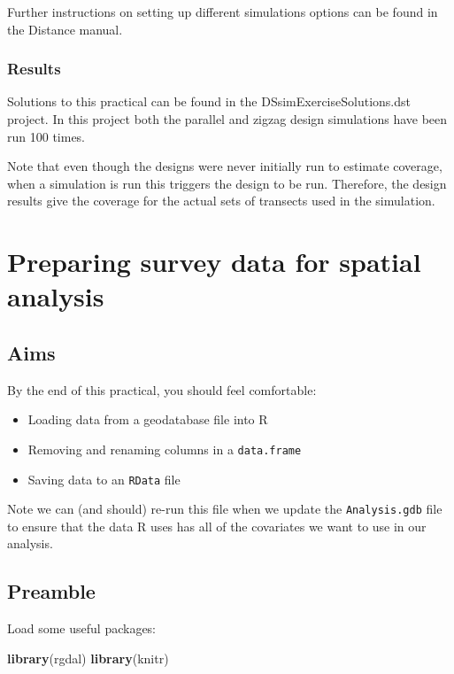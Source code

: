 \documentclass[]{book}
\newenvironment{Shaded}{\begin{snugshade}}{\end{snugshade}}
\newcommand{\KeywordTok}[1]{\textcolor[rgb]{0.13,0.29,0.53}{\textbf{#1}}}
\newcommand{\NormalTok}[1]{#1}
\providecommand{\tightlist}{%
  \setlength{\itemsep}{0pt}\setlength{\parskip}{0pt}}
\theoremstyle{definition}
\theoremstyle{definition}
\theoremstyle{remark}
\begin{document}
Further instructions on setting up different simulations options can be
found in the Distance manual.

\subsection{Results}\label{results}

Solutions to this practical can be found in the
DSsimExerciseSolutions.dst project. In this project both the parallel
and zigzag design simulations have been run 100 times.

Note that even though the designs were never initially run to estimate
coverage, when a simulation is run this triggers the design to be run.
Therefore, the design results give the coverage for the actual sets of
transects used in the simulation.

\chapter{Preparing survey data for spatial
analysis}\label{preparing-survey-data-for-spatial-analysis}

\section{Aims}\label{aims}

By the end of this practical, you should feel comfortable:

\begin{itemize}
\tightlist
\item
  Loading data from a geodatabase file into R
\item
  Removing and renaming columns in a \texttt{data.frame}
\item
  Saving data to an \texttt{RData} file
\end{itemize}

Note we can (and should) re-run this file when we update the
\texttt{Analysis.gdb} file to ensure that the data R uses has all of the
covariates we want to use in our analysis.

\section{Preamble}\label{preamble}

Load some useful packages:

\begin{Shaded}
\begin{Highlighting}[]
\KeywordTok{library}\NormalTok{(rgdal)}
\KeywordTok{library}\NormalTok{(knitr)}
\end{Highlighting}
\end{Shaded}
\end{document}
